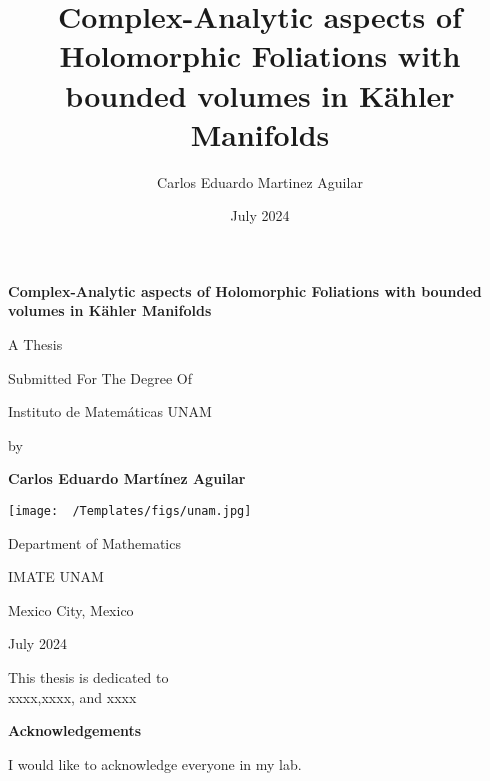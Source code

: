 \documentclass[12pt,twoside,a4paper]{report}
\author{Carlos Eduardo Martinez Aguilar}
\title{Complex-Analytic aspects of Holomorphic Foliations with bounded volumes in Kähler Manifolds}
\date{July 2024}
\newcommand{\thesistitle}{Complex-Analytic aspects of Holomorphic Foliations with bounded volumes in Kähler Manifolds}
\newcommand{\myname}{Carlos Eduardo Martínez Aguilar}
\newcommand{\thesisdate}{July 2024}
\begin{document}
\begin{titlepage}
    \centering
     {\huge \textbf{\thesistitle} \par}
      \vspace{2cm}
     {\large \sc A Thesis \par}
      \vspace{0.2cm}
     {\large \sc Submitted For The Degree Of \par}
     \vspace{0.2cm}
      {\large {} \par} 
     \vspace{0.2cm}
     {\large \sc Instituto de Matemáticas UNAM  \par}
     \vspace{1cm}
     {\large  by \par}
     \vspace{0.5cm}
     {\large \textbf{\myname} \par}
     \vspace{2cm}
     \texttt{[image: ~/Templates/figs/unam.jpg]} %
    \vspace{1cm}
    {\large \sc Department of Mathematics \par}
     {\large \sc IMATE UNAM  \par}
     {\large \sc Mexico City, Mexico \par}
    \vspace{0.5cm}
    {\large \sc \thesisdate \par}
    \vspace{2cm}
\end{titlepage}

\clearpage
\thispagestyle{empty}

\clearpage
\thispagestyle{empty}
\begin{center}
    \vspace*{\fill}
    This thesis is dedicated to\\
    xxxx,xxxx, and xxxx
    \vspace*{\fill}
\end{center}
\clearpage


\clearpage
\thispagestyle{plain}
\begin{center} 
    \huge\textbf{Acknowledgements}\\
\end{center}
    \normalsize
    I would like to acknowledge everyone in my lab.
\clearpage
\end{document}
